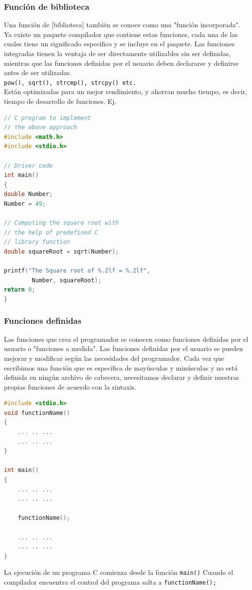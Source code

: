 \documentclass{article}
\begin{document}
\subsubsection{Función de biblioteca}
Una función de [biblioteca] también se conoce como una "función incorporada". Ya existe un paquete compilador que contiene estas funciones, cada una de las cuales tiene un significado específico y se incluye en el paquete. Las funciones integradas tienen la ventaja de ser directamente utilizables sin ser definidas, mientras que las funciones definidas por el usuario deben declararse y definirse antes de ser utilizadas. \\

\texttt{pow(), sqrt(), strcmp(), strcpy() etc.} \\

Están optimizadas para un mejor rendimiento, y ahorran mucho tiempo, es decir, tiempo de desarrollo de funciones. Ej.
\begin{lstlisting}[style=mystyle, language=C]
// C program to implement
// the above approach
#include <math.h>
#include <stdio.h>

// Driver code
int main()
{
double Number;
Number = 49;

// Computing the square root with
// the help of predefined C
// library function
double squareRoot = sqrt(Number);

printf("The Square root of %.2lf = %.2lf",
		Number, squareRoot);
return 0;
}
\end{lstlisting}
\subsubsection{Funciones definidas}
Las funciones que crea el programador se conocen como funciones definidas por el usuario o "funciones a medida". Las funciones definidas por el usuario se pueden mejorar y modificar según las necesidades del programador. Cada vez que escribimos una función que es específica de mayúsculas y minúsculas y no está definida en ningún archivo de cabecera, necesitamos declarar y definir nuestras propias funciones de acuerdo con la sintaxis.

\begin{lstlisting}[style=mystyle, language=C]
#include <stdio.h>
void functionName()
{
    ... .. ...
    ... .. ...
}

int main()
{
    ... .. ...
    ... .. ...

    functionName();
    
    ... .. ...
    ... .. ...
}
\end{lstlisting}
La ejecución de un programa C comienza desde la función \texttt{main()} Cuando el compilador encuentra el control del programa salta a \texttt{functionName();}
\end{document}
